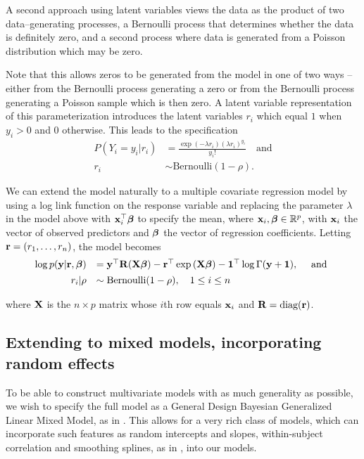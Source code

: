 A second approach using latent variables views the data as the product of two data--generating processes, a
Bernoulli process that determines whether the data is definitely zero, and a second process where data is
generated from a Poisson distribution which may be zero.

Note that this allows zeros to be generated from the model in one of two ways -- either from the Bernoulli
process generating a zero or from the Bernoulli process generating a Poisson sample which is then zero.
A latent variable representation of this parameterization introduces the latent variables $r_i$ which
equal $1$ when $y_i>0$ and $0$ otherwise. This leads to the specification
$$
\begin{array}{rl}
	P(Y_i=y_i|r_i) &= \frac{\exp(-\lambda r_i)(\lambda r_i)^{y_i}}{y_i!} \quad \mbox{and} \\
	r_i &\sim \mbox{Bernoulli}(1-\rho).
\end{array}
$$

We can extend the model naturally to a multiple covariate regression model by using a log link function on the
response variable and replacing the parameter $\lambda$ in the model above with ${\bf x}_i^\top {\boldsymbol\beta}$ to specify
the mean, where ${\bf x}_i,{\boldsymbol \beta} \in {\mathbb{R}}^p$, with ${\bf x}_i$ the vector of observed predictors and ${\boldsymbol \beta}$ the
vector of regression coefficients. Letting ${\bf r} = (r_1,\ldots,r_n)$, the model becomes
\[%
	\begin{array}{rl}
		\log p(\vy|\vr, \vbeta) 
		    & = \vy^\top \mR (\mX\vbeta)                           
		- \vr^\top \exp{(\mX\vbeta)} 
		- \vone^\top \log{\Gamma{(\vy + \vone)}}, \quad \mbox{ and }\\ [1ex]
		r_i | \rho & \sim \text{Bernoulli}(1-\rho), \quad 1 \leq i \leq n \\
	\end{array}
\]

\noindent where ${\bf X}$ is the $n\times p$ matrix whose $i$th row equals ${\bf x}_i$ and ${\bf R} = \text{diag}{({\bf r})}$.

\subsection{Extending to mixed models, incorporating random effects}

To be able to construct multivariate models with as much generality as possible, we wish to specify the full
model as a General Design Bayesian Generalized Linear Mixed Model, as in \citep{Zhao2006}. This allows for a
very rich class of models, which can incorporate such features as random intercepts and slopes, within-subject
correlation and smoothing splines, as in \citep{Wand2008}, into our models.


